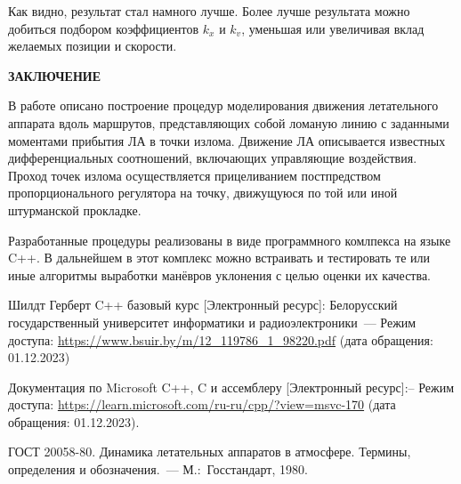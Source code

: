 \documentclass[a4paper,12pt]{article}
\newcounter{def}
\numberwithin{figure}{subsubsection}
\begin{document}
Как видно, результат стал намного лучше. Более лучше результата можно добиться подбором коэффициентов $k_x$ и $k_v$, уменьшая или увеличивая вклад желаемых позиции и скорости.

\clearpage

\centerline{\textbf{\large ЗАКЛЮЧЕНИЕ}}

\bigskip
В работе описано построение процедур моделирования движения летательного аппарата вдоль маршрутов, представляющих собой ломаную линию с заданными моментами прибытия ЛА в точки излома. Движение ЛА описывается известных дифференциальных соотношений, включающих управляющие воздействия. Проход точек излома осуществляется прицеливанием постпредством пропорционального регулятора на точку, движущуюся по той или иной штурманской прокладке.   

Разработанные процедуры реализованы в виде программного комлпекса на языке C++. В дальнейшем в этот комплекс можно встраивать и тестировать те или иные алгоритмы выработки манёвров уклонения с целью оценки их качества. 
 
\newpage
\def\refname{\begin{center}\textbf{\large СПИСОК ИСПОЛЬЗОВАННЫХ ИСТОЧНИКОВ И ЛИТЕРАТУРЫ}
\end{center}}

\makeatletter
\renewcommand{\@biblabel}[1]{#1.}
\makeatother

\begin{thebibliography}{99}
Шилдт Герберт C++ базовый курс  [Электронный ресурс]:
Белорусский государственный университет информатики и радиоэлектроники~--- Режим доступа: \url{https://www.bsuir.by/m/12_119786_1_98220.pdf}
(дата обращения: 01.12.2023)

Документация по Microsoft C++, C и ассемблеру [Электронный ресурс]:-- Режим доступа:
\url{https://learn.microsoft.com/ru-ru/cpp/?view=msvc-170} (дата обращения: 01.12.2023).

 ГОСТ 20058-80. Динамика летательных аппаратов в атмосфере. Термины, определения и обозначения.~--- М.:~Госстандарт, 1980.

\end{thebibliography}

\label{LastPage}
\end{document}
